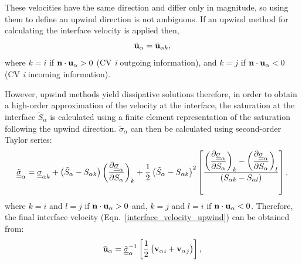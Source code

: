 These velocities have the same direction and differ only in magnitude, so using them to define an upwind direction is not ambiguous. If an upwind method for calculating the interface velocity is applied then,
\begin{equation}
  {\tilde{\bf u}}_{\alpha} = \tilde{\bf u}_{\alpha k},\label{interface_velocity_upwind}
\end{equation}
where $k=i$ if ${\bf n}\cdot{\bf u}_{\alpha}>0$ (CV {\it i} outgoing information), and $k=j$ if ${\bf n}\cdot{\bf u}_{\alpha}<0$ (CV {\it i} incoming information). 

However, upwind methods yield dissipative solutions therefore, in order to obtain a high-order approximation of the velocity at the interface, the saturation at the interface $\tilde{S}_{\alpha}$ is calculated using a finite element representation of the saturation following the upwind direction. $\tilde \sigma_{\alpha}$ can then be calculated using second-order Taylor series:
\begin{equation}
    \underline{\underline{\tilde{\sigma}}}_{\alpha} = \underline{\underline{\sigma}}_{\alpha k} + \left(\tilde{S}_{\alpha}-S_{\alpha k}\right) \left(\displaystyle\frac{\partial \underline{\underline{\sigma}}_{\alpha}}{\partial S_{\alpha}}\right)_{k} + \displaystyle\frac{1}{2}\left(\tilde{S}_{\alpha}-S_{\alpha k}\right)^{2} \left[ \displaystyle\frac{ \left(\displaystyle\frac{\partial \underline{\underline{\sigma}}_{\alpha}}{\partial S_{\alpha}}\right)_{k} - \left(\displaystyle\frac{\partial \underline{\underline{\sigma}}_{\alpha}}{\partial S_{\alpha}}\right)_{l} } { \left(S_{\alpha k}-S_{\alpha l}\right) } \right], \label{sigma-out}
\end{equation}
where $k=i$ and $l=j$ if ${\bf n}\cdot{\bf u}_{\alpha}>0$ and, $k=j$ and $l=i$ if ${\bf n}\cdot{\bf u}_{\alpha}<0$. Therefore, the final interface velocity (Eqn.~\ref{interface_velocity_upwind}) can be obtained from:
\begin{equation}
  {\tilde{\bf u}_{\alpha}} = \underline{\underline{\tilde{\sigma}}}_{\alpha}^{-1} \left[\displaystyle\frac{1}{2} \left( {{\bf v}_\alpha}_i + {{\bf v}_\alpha}_j \right)\right], \label{mean_int_vel}  
\end{equation} 
